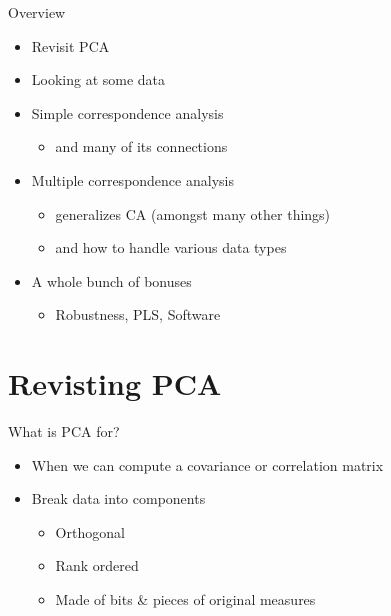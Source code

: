 \documentclass[
  ignorenonframetext,
]{beamer}
\providecommand{\tightlist}{%
  \setlength{\itemsep}{0pt}\setlength{\parskip}{0pt}}
\begin{document}
\begin{frame}{Overview}
\protect\hypertarget{overview}{}

\begin{itemize}[<+->]
\tightlist
\item
  Revisit PCA
\item
  Looking at some data
\item
  Simple correspondence analysis

  \begin{itemize}[<+->]
  \tightlist
  \item
    and many of its connections
  \end{itemize}
\item
  Multiple correspondence analysis

  \begin{itemize}[<+->]
  \tightlist
  \item
    generalizes CA (amongst many other things)
  \item
    and how to handle various data types
  \end{itemize}
\item
  A whole bunch of bonuses

  \begin{itemize}[<+->]
  \tightlist
  \item
    Robustness, PLS, Software
  \end{itemize}
\end{itemize}

\end{frame}

\hypertarget{revisting-pca}{%
\section{Revisting PCA}\label{revisting-pca}}

\begin{frame}{What is PCA for?}
\protect\hypertarget{what-is-pca-for}{}

\begin{itemize}[<+->]
\tightlist
\item
  When we can compute a covariance or correlation matrix
\item
  Break data into components

  \begin{itemize}[<+->]
  \tightlist
  \item
    Orthogonal
  \item
    Rank ordered
  \item
    Made of bits \& pieces of original measures
  \end{itemize}
\end{itemize}

\end{frame}
\end{document}

